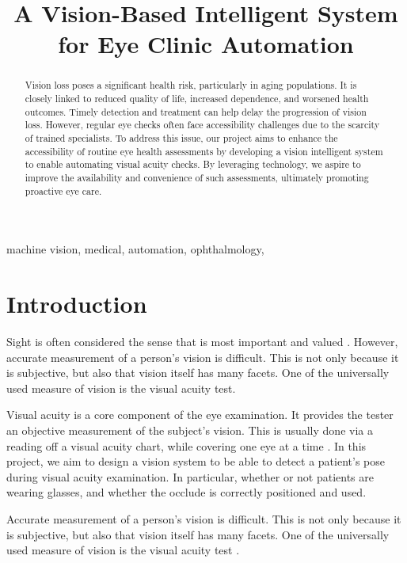 \documentclass{article}
\title{A Vision-Based Intelligent System for Eye Clinic Automation}
\begin{document}
%
\maketitle
%

\begin{abstract}

Vision loss poses a significant health risk, particularly in aging populations. It is closely linked to reduced quality of life, increased dependence, and worsened health outcomes. Timely detection and treatment can help delay the progression of vision loss. However, regular eye checks often face accessibility challenges due to the scarcity of trained specialists. To address this issue, our project aims to enhance the accessibility of routine eye health assessments by developing a vision intelligent system to enable automating visual acuity checks. By leveraging technology, we aspire to improve the availability and convenience of such assessments, ultimately promoting proactive eye care. 

\end{abstract}
%

\begin{keywords}
machine vision, medical, automation, ophthalmology,
\end{keywords}
%
\section{Introduction}
\label{sec:intro}
Sight is often considered the sense that is most important and valued \cite{enoch2019evaluating}. However, accurate measurement of a person’s vision is difficult. This is not only because it is subjective, but also that vision itself has many facets. One of the universally used measure of vision is the visual acuity test.

Visual acuity is a core component of the eye examination. It provides the tester an objective measurement of the subject’s vision. This is usually done via a reading off a visual acuity chart, while covering one eye at a time \cite{dejong2022history}. In this project, we aim to design a vision system to be able to detect a patient’s pose during visual acuity examination. In particular, whether or not patients are wearing glasses, and whether the occlude is correctly positioned and used.

Accurate measurement of a person’s vision is difficult. This is not only because it is subjective, but also that vision itself has many facets. One of the universally used measure of vision is the visual acuity test \cite{dejong2022history}. 
\end{document}
